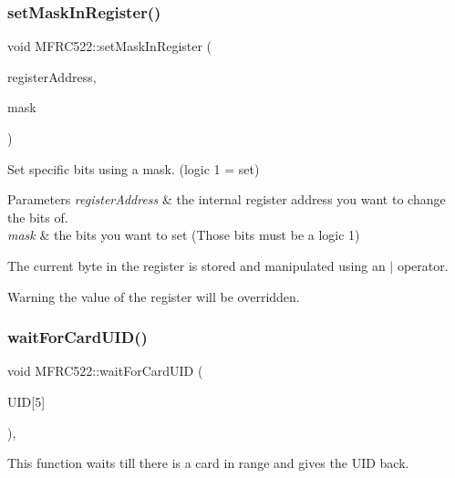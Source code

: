 \subsubsection{\texorpdfstring{set\+Mask\+In\+Register()}{setMaskInRegister()}}
{\footnotesize\ttfamily void M\+F\+R\+C522\+::set\+Mask\+In\+Register (\begin{DoxyParamCaption}\item[{\mbox{\hyperlink{class_m_f_r_c522_ae7ec09eb8c9c61288a4770175b4b8db7}{R\+EG}}}]{register\+Address,  }\item[{uint8\+\_\+t}]{mask }\end{DoxyParamCaption})\hspace{0.3cm}{\ttfamily [protected]}}



Set specific bits using a mask. (logic 1 = set) 


\begin{DoxyParams}{Parameters}
{\em register\+Address} & the internal register address you want to change the bits of. \\
\hline
{\em mask} & the bits you want to set (Those bits must be a logic 1)\\
\hline
\end{DoxyParams}
The current byte in the register is stored and manipulated using an $\vert$ operator. \begin{DoxyWarning}{Warning}
the value of the register will be overridden. 
\end{DoxyWarning}
\mbox{\label{class_m_f_r_c522_aeb05c83c2d139eb2c57f400399982691}} 
\subsubsection{\texorpdfstring{wait\+For\+Card\+U\+I\+D()}{waitForCardUID()}}
{\footnotesize\ttfamily void M\+F\+R\+C522\+::wait\+For\+Card\+U\+ID (\begin{DoxyParamCaption}\item[{uint8\+\_\+t}]{U\+ID\mbox{[}5\mbox{]} }\end{DoxyParamCaption})\hspace{0.3cm}{\ttfamily [override]}, {\ttfamily [virtual]}}



This function waits till there is a card in range and gives the U\+ID back. 

